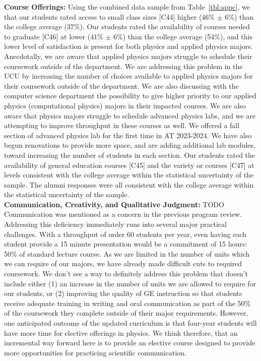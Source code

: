 \documentclass[12pt]{article}
\begin{document}
\noindent
{\bf Course Offerings:} Using the combined data sample from
Table~\ref{tbl:appc}, we that our students rated access to small class
sizes [C44] higher (46\% $\pm$ 6\%) than the college average ($37\%$).
Our students rated the availability of courses needed to graduate
[C46] at lower (41\% $\pm$ 6\%) than the college average (54\%), and
this lower level of satisfaction is present for both physics and
applied physics majors.  Anecdotally, we are aware that applied
physics majors struggle to schedule their coursework outside of the
department.  We are addressing this problem in the UCU by increasing
the number of choices available to applied physics majors for their
coursework outside of the department.  We are also discussing with the
computer science department the possibility to give higher priority to
our applied physics (computational physics) majors in their impacted
courses.  We are also aware that physics majors struggle to schedule
advanced physics labs, and we are attempting to improve throughput in
these courses as well.  We offered a fall section of advanced physics
lab for the first time in AT 2023-2024.  We have also begun renovations
to provide more space, and are adding additional lab modules, toward
increasing the number of students in each section.  Our students rated
the availability of general education courses [C45] and the variety or
courses [C47] at levels consistent with the college average within
the statistical uncertainty of the sample.  The alumni responses were
all consistent with the college average within the statistical
uncertainty of the sample.\\[3pt]

\noindent
{\bf Communication, Creativity, and Qualitative Judgment:} {\color{red}TODO}
Communication was mentioned as a concern in the previous program
review.  Addressing this deficiency immediately runs into several
major practical challenges.  With a throughput of order 60 students
per year, even having each student provide a 15 minute presentation
would be a commitment of 15 hours: 50\% of standard lecture course.
As we are limited in the number of units which we can require of our
majors, we have already made difficult cuts to required coursework.
We don't see a way to definitely address this problem that doesn't
include either (1) an increase in the number of units we are allowed
to require for our students, or (2) improving the quality of GE
instruction so that students receive adequate training in writing and
oral communication as part of the 50\% of the coursework they
complete outside of their major requirements.  However, one
anticipated outcome of the updated curriculum is that four-year
students will have more time for elective offerings in physics.  We
think therefore, that an incremental way forward here is to provide an
elective course designed to provide more opportunities for practicing
scientific communication.
\end{document}
